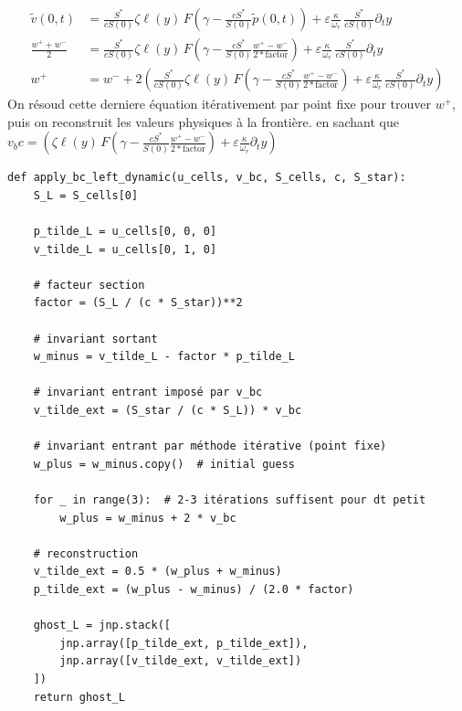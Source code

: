 \documentclass[12pt,a4paper]{article}
\begin{document}
\begin{equation}
    \begin{align}
        \tilde{v}(0,t) &= \frac{S^\ast}{c S(0)} \zeta \ell(y)\,F\left(\gamma - \frac{cS^\ast}{S(0)}\tilde{p}(0,t)\right) + \varepsilon\frac{\kappa}{\omega_r}\,\frac{S^\ast}{c S(0)}\partial_t y \\
        \frac{w^+ + w^-}{2} &= \frac{S^\ast}{c S(0)} \zeta \ell(y)\,F\left(\gamma - \frac{cS^\ast}{S(0)}\frac{w^+ - w^-}{2*\text{factor}}\right) + \varepsilon\frac{\kappa}{\omega_r}\,\frac{S^\ast}{c S(0)}\partial_t y\\
        w^+ &= w^- + 2 \left( \frac{S^\ast}{c S(0)} \zeta \ell(y)\,F\left(\gamma - \frac{cS^\ast}{S(0)}\frac{w^+ - w^-}{2*\text{factor}}\right) + \varepsilon\frac{\kappa}{\omega_r}\,\frac{S^\ast}{c S(0)}\partial_t y \right)
    \end{align}
\end{equation}
On résoud cette derniere équation itérativement par point fixe pour trouver $w^+$, puis on reconstruit les valeurs physiques à la frontière.
en sachant que $v_bc = \left(\zeta \ell(y)\,F\left(\gamma - \frac{cS^\ast}{S(0)}\frac{w^+ - w^-}{2*\text{factor}}\right) + \varepsilon\frac{\kappa}{\omega_r}\partial_t y \right) $

\begin{verbatim}
def apply_bc_left_dynamic(u_cells, v_bc, S_cells, c, S_star):
    S_L = S_cells[0]

    p_tilde_L = u_cells[0, 0, 0]
    v_tilde_L = u_cells[0, 1, 0]

    # facteur section
    factor = (S_L / (c * S_star))**2

    # invariant sortant
    w_minus = v_tilde_L - factor * p_tilde_L

    # invariant entrant imposé par v_bc
    v_tilde_ext = (S_star / (c * S_L)) * v_bc

    # invariant entrant par méthode itérative (point fixe)
    w_plus = w_minus.copy()  # initial guess

    for _ in range(3):  # 2-3 itérations suffisent pour dt petit
        w_plus = w_minus + 2 * v_bc

    # reconstruction
    v_tilde_ext = 0.5 * (w_plus + w_minus)
    p_tilde_ext = (w_plus - w_minus) / (2.0 * factor)

    ghost_L = jnp.stack([
        jnp.array([p_tilde_ext, p_tilde_ext]),
        jnp.array([v_tilde_ext, v_tilde_ext])
    ])
    return ghost_L
\end{verbatim}
\end{document}
